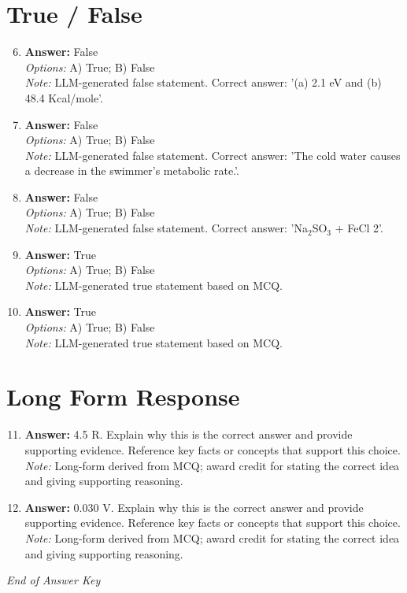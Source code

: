 \documentclass[12pt]{article}
\begin{document}
\section*{True / False}
\begin{enumerate}[label=\arabic*.]
\setcounter{enumi}{5}
\item \textbf{Answer:} False
\\ \textit{Options:} A) True; B) False
\\ \textit{Note:} LLM-generated false statement. Correct answer: '(a) 2.1 eV and (b) 48.4 Kcal/mole'.
\item \textbf{Answer:} False
\\ \textit{Options:} A) True; B) False
\\ \textit{Note:} LLM-generated false statement. Correct answer: 'The cold water causes a decrease in the swimmer's metabolic rate.'.
\item \textbf{Answer:} False
\\ \textit{Options:} A) True; B) False
\\ \textit{Note:} LLM-generated false statement. Correct answer: 'Na$_{2}$SO$_{3}$ + FeCl 2'.
\item \textbf{Answer:} True
\\ \textit{Options:} A) True; B) False
\\ \textit{Note:} LLM-generated true statement based on MCQ.
\item \textbf{Answer:} True
\\ \textit{Options:} A) True; B) False
\\ \textit{Note:} LLM-generated true statement based on MCQ.
\end{enumerate}

\section*{Long Form Response}
\begin{enumerate}[label=\arabic*.]
\setcounter{enumi}{10}
\item \textbf{Answer:} 4.5 R. Explain why this is the correct answer and provide supporting evidence. Reference key facts or concepts that support this choice.
\\ \textit{Note:} Long-form derived from MCQ; award credit for stating the correct idea and giving supporting reasoning.
\item \textbf{Answer:} 0.030 V. Explain why this is the correct answer and provide supporting evidence. Reference key facts or concepts that support this choice.
\\ \textit{Note:} Long-form derived from MCQ; award credit for stating the correct idea and giving supporting reasoning.
\end{enumerate}

\vfill
\noindent\textit{End of Answer Key}
\end{document}

